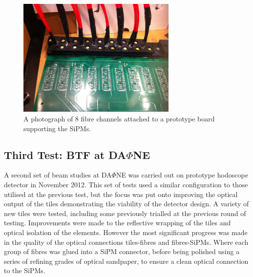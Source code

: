 \begin{figure}
	\centering
	\includegraphics[width=0.7\textwidth]{ImgChap1/holderboard}
	\caption{A photograph of 8 fibre channels attached to a prototype board supporting the SiPMs.}
	\label{Frascati2SetupDiagram}
\end{figure}




\subsection{Third Test: BTF at DA$\Phi$NE}

A second set of beam studies at DA$\Phi$NE was carried out on prototype hodoscope detector in November 2012. This set of tests used a similar configuration to those utilised at the previous test, but the focus was put onto improving the optical output of the tiles demonstrating the viability of the detector design. A variety of new tiles were tested, including some previously trialled at the previous round of testing. Improvements were made to the reflective wrapping of the tiles and optical isolation of the elements. However the most significant progress was made in the quality of the optical connections tiles-fibres and fibres-SiPMs. Where each group of fibres was glued into a SiPM connector, before being polished using a series of refining grades of optical sandpaper, to ensure a clean optical connection to the SiPMs.


